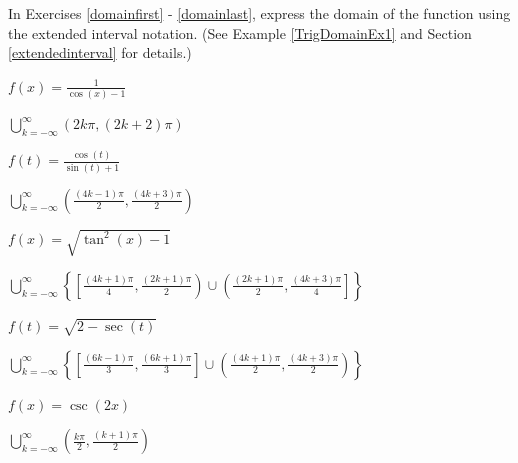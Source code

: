 \documentclass{ximera}
\begin{document}
\begin{question}
In Exercises \ref{domainfirst} - \ref{domainlast}, express the domain of the function using the extended interval notation. (See Example \ref{TrigDomainEx1} and Section \ref{extendedinterval} for details.)

\begin{problem} \label{domainfirst}
$f(x) = \frac{1}{\cos(x) - 1}$

\begin{solution}
$\displaystyle \bigcup_{k=-\infty}^{\infty} \left( 2k\pi, (2k+2)\pi \right)$
\end{solution}
\end{problem}

\begin{problem}
$f(t) = \frac{\cos(t)}{\sin(t) + 1}$

\begin{solution}
$\displaystyle \bigcup_{k=-\infty}^{\infty} \left( \frac{(4k - 1)\pi}{2}, \frac{(4k + 3)\pi}{2} \right)$
\end{solution}
\end{problem}

\begin{problem}
$f(x) = \sqrt{\tan^{2}(x) - 1}$

\begin{solution}
$\displaystyle \bigcup_{k=-\infty}^{\infty} \left\{ \left[ \frac{(4k + 1)\pi}{4}, \frac{(2k + 1)\pi}{2} \right) \cup \left( \frac{(2k + 1)\pi}{2}, \frac{(4k + 3)\pi}{4} \right] \right\}$
\end{solution}
\end{problem}

\begin{problem}
$f(t) = \sqrt{2 - \sec(t)}$

\begin{solution}
$\displaystyle \bigcup_{k=-\infty}^{\infty} \left\{ \left[ \frac{(6k - 1)\pi}{3}, \frac{(6k + 1)\pi}{3} \right] \cup \left( \frac{(4k + 1)\pi}{2}, \frac{(4k + 3)\pi}{2} \right) \right\}$
\end{solution}
\end{problem}

\begin{problem}
$f(x) = \csc(2x)$

\begin{solution}
$\displaystyle \bigcup_{k=-\infty}^{\infty} \left( \frac{k\pi}{2}, \frac{(k+1)\pi}{2} \right)$
\end{solution}
\end{problem}


\end{question}
\end{document}
